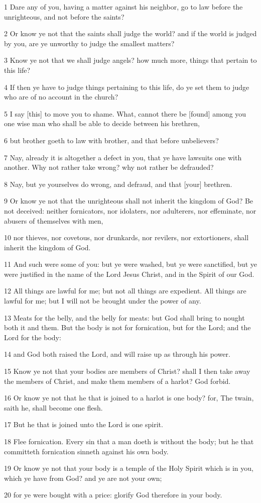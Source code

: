 \par 1 Dare any of you, having a matter against his neighbor, go to law before the unrighteous, and not before the saints?
\par 2 Or know ye not that the saints shall judge the world? and if the world is judged by you, are ye unworthy to judge the smallest matters?
\par 3 Know ye not that we shall judge angels? how much more, things that pertain to this life?
\par 4 If then ye have to judge things pertaining to this life, do ye set them to judge who are of no account in the church?
\par 5 I say [this] to move you to shame. What, cannot there be [found] among you one wise man who shall be able to decide between his brethren,
\par 6 but brother goeth to law with brother, and that before unbelievers?
\par 7 Nay, already it is altogether a defect in you, that ye have lawsuits one with another. Why not rather take wrong? why not rather be defrauded?
\par 8 Nay, but ye yourselves do wrong, and defraud, and that [your] brethren.
\par 9 Or know ye not that the unrighteous shall not inherit the kingdom of God? Be not deceived: neither fornicators, nor idolaters, nor adulterers, nor effeminate, nor abusers of themselves with men,
\par 10 nor thieves, nor covetous, nor drunkards, nor revilers, nor extortioners, shall inherit the kingdom of God.
\par 11 And such were some of you: but ye were washed, but ye were sanctified, but ye were justified in the name of the Lord Jesus Christ, and in the Spirit of our God.
\par 12 All things are lawful for me; but not all things are expedient. All things are lawful for me; but I will not be brought under the power of any.
\par 13 Meats for the belly, and the belly for meats: but God shall bring to nought both it and them. But the body is not for fornication, but for the Lord; and the Lord for the body:
\par 14 and God both raised the Lord, and will raise up as through his power.
\par 15 Know ye not that your bodies are members of Christ? shall I then take away the members of Christ, and make them members of a harlot? God forbid.
\par 16 Or know ye not that he that is joined to a harlot is one body? for, The twain, saith he, shall become one flesh.
\par 17 But he that is joined unto the Lord is one spirit.
\par 18 Flee fornication. Every sin that a man doeth is without the body; but he that committeth fornication sinneth against his own body.
\par 19 Or know ye not that your body is a temple of the Holy Spirit which is in you, which ye have from God? and ye are not your own;
\par 20 for ye were bought with a price: glorify God therefore in your body.

